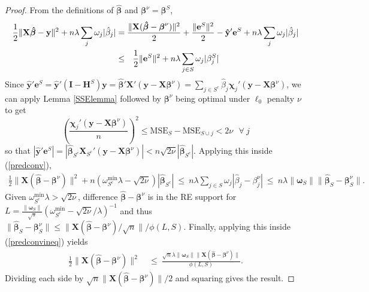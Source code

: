 \documentclass[12pt]{article}
\newcommand{\bs}[1]{\boldsymbol{#1}}
\newcommand{\mr}[1]{\mathrm{#1}}
\newcommand{\bm}[1]{\mathbf{#1}}
\begin{document}
\begin{proof}
From the definitions of $\bs{\hat\beta}$ and $\bs{\beta}^\nu = \bs{\beta}^S$, 
\begin{align}\label{predconv}
\frac{1}{2}\|\bm{X}\bs{\hat \beta}-\bm{y}\|^2 +  n\lambda\sum_j\omega_j|\hat\beta_j|   &= \frac{\|\bm{X}(\bs{\hat\beta}-\bs{\beta}^\nu)\|^2}{2} + \frac{\|\bm{e}^S\|^2}{2} - \bm{\hat y}'\bm{e}^S+ n\lambda\sum_j\omega_j|\hat\beta_j| 
\\&\leq~~\frac{1}{2}\|\bm{e}^S\|^2 + n\lambda\sum_{j\in S}\omega_j|\beta^S_j|\notag
\end{align}
  Since $\bm{\hat y}'\bm{e}^S = \bm{\hat y}'(\bm{I}-\bm{H}^S)\bm{y} =
\bs{\hat\beta}'\bm{X}'(\bm{y}-\bm{X}\bs{\beta}^\nu) = 
\sum_{j\in S^c} \hat\beta_j\bs{\chi}_j'(\bm{y}-\bm{X}\bs{\beta}^\nu)
$,
 we can apply Lemma \ref{SSElemma} followed by $\bs{\beta}^\nu$ being optimal under $\ell_0$ penalty $\nu$ to get 
\begin{equation} \label{L0ineq}
\left(\frac{\bs{\chi}_j'(\bm{y}-\bm{X}\bs{\beta}^\nu)}{n}\right)^2
\leq \mr{MSE}_S - \mr{MSE}_{S\cup j} < 2\nu ~~~\forall~j
\end{equation}
so that $|\bm{\hat y}'\bm{e}^S| = |\bs{\hat\beta}_{S^c}\bm{X}_{S^c}'(\bm{y}-\bm{X}\bs{\beta}^\nu)| < n\sqrt{2\nu}|\bs{\hat\beta}_{S^c}|$.  Applying this inside (\ref{predconv}),
\begin{align}\label{predconvineq}
\frac{1}{2}\|\bm{X}(\bs{\hat\beta}-\bs{\beta}^\nu)\|^2
  + n\left(\omega^{\mr{min}}_{S^c}\lambda-\sqrt{2\nu}\right)|\bs{\hat\beta}_{S^c}|
  ~\leq~ n\lambda\sum_{j\in S}\omega_j|\hat\beta_{j}-\beta^\nu_j|
  ~\leq~ n\lambda\|\bs{\omega}_S\|\|\bs{\hat\beta}_{S}-\bs{\beta}^\nu_S\|.
\end{align}
Given $\omega^{\mr{min}}_{S^c}\lambda > \sqrt{2\nu}$,
difference $\bs{\hat\beta}-\bs{\beta}^\nu$ is in the RE support for 
$L=\frac{\|\bs{\omega}_S\|}{\sqrt{s}}(\omega^{\mr{min}}_{S^c}-\sqrt{2\nu}/\lambda)^{-1}$ and thus $\|\bs{\hat\beta}_{S}-\bs{\beta}^\nu_S\| \leq \|\bm{X}(\bs{\hat\beta}-\bs{\beta}^\nu)/\sqrt{n}\|/\phi(L,S)$.  Finally, applying this inside (\ref{predconvineq}) yields
\begin{align}
\frac{1}{2}\|\bm{X}(\bs{\hat\beta}-\bs{\beta}^\nu)\|^2
  &~\leq~ \frac{\sqrt{n}\lambda\|\bs{\omega}_S\|\|\bm{X}(\bs{\hat\beta}-\bs{\beta}^\nu)\|}
  {\phi(L, S)}.
\end{align}
Dividing each side by $\sqrt{n}\|\bm{X}(\bs{\hat\beta}-\bs{\beta}^\nu)\|/2$ and squaring gives the result.
\end{proof}
\end{document}
